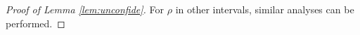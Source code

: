 \documentclass[11pt,onecolumn]{article}
\newcommand{\frakT}{\mathfrak{T}}
\newcommand{\tiln}{\tilde{n}}
\newtheorem{theorem}{Theorem}
\begin{document}
\begin{proof}[Proof of Lemma \ref{lem:unconfide}]
	For $\rho$ in other intervals,  similar analyses can be performed.
\end{proof}















\end{document}
